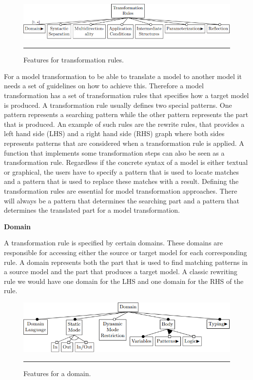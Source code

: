 \begin{figure}[H]
  \centering
    \includegraphics[scale=0.65]{./Figures/TransformationRules_1.png}
    \rule{35em}{0.5pt}
  \caption[Feature diagram for transformation rules]
  {Features for transformation rules.}
  \label{fig:TransformationRules}
\end{figure}

For a model transformation to be able to translate a model to another model it
needs a set of guidelines on how to achieve this. Therefore a model
transformation has a set of transformation rules that specifies how a target
model is produced. A transformation rule usually defines two special patterns.
One pattern represents a searching pattern while the other pattern represents
the part that is produced.  An example of such rules are the rewrite
rules, that provides a left hand side (LHS) and a right hand side (RHS)
graph where both sides represents patterns that are considered
when a transformation rule is applied. A function that implements some
transformation steps can also be seen as a transformation rule. Regardless if
the concrete syntax of a model is either textual or graphical, the users have to
specify a pattern that is used to locate matches and a pattern that is used to replace
these matches with a result. Defining the transformation rules are essential for
model transformation approaches. There will always be a pattern that determines
the searching part and a pattern that determines the translated part for a model
transformation.

\textbf{Domain}
\label{domain}

A transformation rule is specified by certain domains. These domains are
responsible for accessing either the source or target model for each
corresponding rule. A domain represents both the part that is used to find
matching patterns in a source model and the part that produces a target model.
A classic rewriting rule we would have one domain for the LHS and one domain for
the RHS of the rule.

\begin{figure}[H]
  \centering
    \includegraphics[scale=0.65]{./Figures/Domain_1.png}
    \rule{35em}{0.5pt}
  \caption[Feature diagram a domain]
  {Features for a domain.}
  \label{fig:Domain}
\end{figure}


